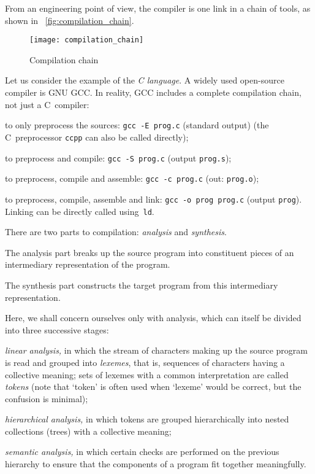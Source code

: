 From an engineering point of view, the compiler is one link in a chain
of tools, as shown in \fig~\vref{fig:compilation_chain}.
\begin{figure}
\centering
\texttt{[image: compilation\_chain]}
\caption{Compilation chain}
\label{fig:compilation_chain}
\end{figure}
Let us consider the example of the \emph{C language}. A widely used
 open\hyp{}source compiler is GNU GCC. In reality, GCC includes a
 complete compilation chain, not just a C~compiler:
\begin{itemize*}

  \item to only preprocess the sources: \texttt{gcc -E prog.c}
  (standard output) (the C~preprocessor \texttt{ccpp} can also be
  called directly);

  \item to preprocess and compile: \texttt{gcc -S prog.c}
  (output \texttt{prog.s});

  \item to preprocess, compile and assemble: \texttt{gcc -c prog.c}
  (out: \texttt{prog.o});

  \item to preprocess, compile, assemble and link: \texttt{gcc -o prog
    prog.c} (output \texttt{prog}). Linking can be directly called
    using~\texttt{ld}.

\end{itemize*}
There are two parts to compilation: \emph{analysis} and
\emph{synthesis}.
\begin{enumerate*}

  \item The analysis part breaks up the source program into
  constituent pieces of an intermediary representation of the
  program.

  \item The synthesis part constructs the target program from this
  intermediary representation.

\end{enumerate*}
Here, we shall concern ourselves only with analysis, which can itself
be divided into three successive stages:
\begin{enumerate*}

  \item \emph{linear analysis,} in which the stream of characters
    making up the source program is read and grouped
    into \emph{lexemes}, that is, sequences of characters having a
    collective meaning; sets of lexemes with a common interpretation
    are called \emph{tokens} (note that `token' is often used when
    `lexeme' would be correct, but the confusion is minimal);

  \item \emph{hierarchical analysis,} in which tokens are grouped
    hierarchically into nested collections (trees) with a collective
    meaning;

  \item \emph{semantic analysis,} in which certain checks are
    performed on the previous hierarchy to ensure that the components
    of a program fit together meaningfully.

\end{enumerate*}
